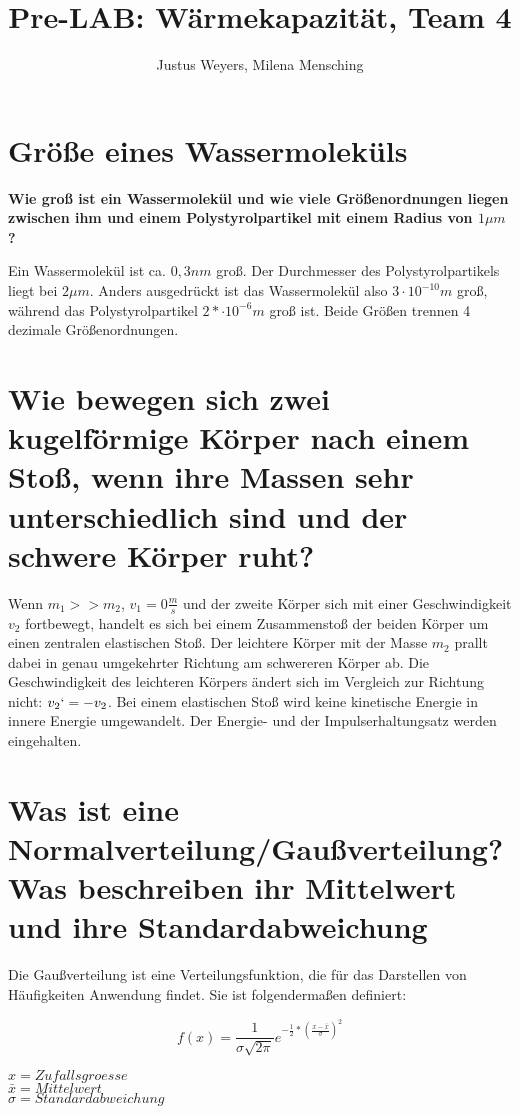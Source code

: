 \documentclass[a4paper, 12pt]{article}
\title{Pre-LAB: Wärmekapazität, Team 4}
\author{Justus Weyers, Milena Mensching}
\begin{document}
\maketitle
\section{Größe eines Wassermoleküls}
\textbf{Wie groß ist ein Wassermolekül und wie viele Größenordnungen liegen zwischen ihm und einem Polystyrolpartikel mit einem Radius von $1\mu m$?}

Ein Wassermolekül ist ca. $0,3 nm$ groß. Der Durchmesser des Polystyrolpartikels liegt bei $2\mu m$. Anders ausgedrückt ist das Wassermolekül also $3 \cdot 10^{-10}m$ groß, während das Polystyrolpartikel $2* \cdot 10^{-6}m$  groß ist. Beide Größen trennen 4 dezimale Größenordnungen.

\section{Wie bewegen sich zwei kugelförmige Körper nach einem Stoß, wenn ihre Massen sehr
unterschiedlich sind und der schwere Körper ruht?}

Wenn $m_1>>m_2$, $v_1= 0 \frac{m}{s} $ und der zweite Körper sich mit einer Geschwindigkeit $v_2$ fortbewegt, handelt es sich bei einem Zusammenstoß der beiden Körper um einen zentralen elastischen Stoß. Der leichtere Körper mit der Masse $m_2$ prallt dabei in genau umgekehrter Richtung am schwereren Körper ab. Die Geschwindigkeit des leichteren Körpers ändert sich im Vergleich zur Richtung nicht: $v_2`= -v_2$. Bei einem elastischen Stoß wird keine kinetische Energie in innere Energie umgewandelt. Der Energie- und der Impulserhaltungsatz werden eingehalten.  

\section{Was ist eine Normalverteilung/Gaußverteilung? Was beschreiben ihr Mittelwert und ihre
Standardabweichung}

Die Gaußverteilung ist eine Verteilungsfunktion, die für das Darstellen von Häufigkeiten Anwendung findet. Sie ist folgendermaßen definiert:

\begin{equation}\label{Normalverteilung}
f(x) = \frac{1}{\sigma\sqrt{2\pi}}e^{-\frac{1}{2}*(\frac{x-\bar{x}}{\sigma})^2}
\end{equation}

\noindent $x = Zufallsgroesse$\\
\noindent $\bar{x} = Mittelwert$\\
\noindent $\sigma = Standardabweichung$\\
\end{document}
